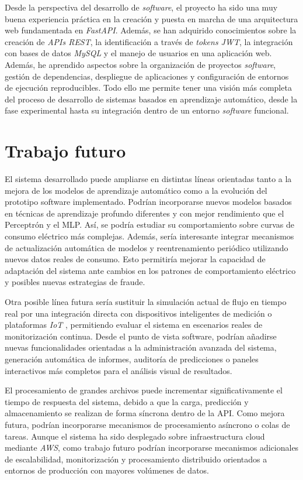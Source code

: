 \documentclass[12pt,a4paper]{report}
\begin{document}
Desde la perspectiva del desarrollo de \emph{software}, el proyecto ha sido una muy buena experiencia práctica en la creación y puesta en marcha de una arquitectura web fundamentada en \emph{FastAPI}. Además, se han adquirido conocimientos sobre la creación de \emph{APIs REST}, la identificación a través de \emph{tokens JWT}, la integración con bases de datos \emph{MySQL} y el manejo de usuarios en una aplicación web. Además, he aprendido aspectos sobre la organización de proyectos \emph{software}, gestión de dependencias, despliegue de aplicaciones y configuración de entornos de ejecución reproducibles. Todo ello me permite tener una visión más completa del proceso de desarrollo de sistemas basados en aprendizaje automático, desde la fase experimental hasta su integración dentro de un entorno \emph{software} funcional.


\section{Trabajo futuro}

El sistema desarrollado puede ampliarse en distintas líneas orientadas tanto a la mejora de los modelos de aprendizaje automático como a la evolución del prototipo software implementado. Podrían incorporarse nuevos modelos basados en técnicas de aprendizaje profundo diferentes y con mejor rendimiento que el Perceptrón y el MLP. Así, se podría estudiar su comportamiento sobre curvas de consumo eléctrico más complejas. Además, sería interesante integrar mecanismos de actualización automática de modelos y reentrenamiento periódico utilizando nuevos datos reales de consumo. Esto permitiría mejorar la capacidad de adaptación del sistema ante cambios en los patrones de comportamiento eléctrico y posibles nuevas estrategias de fraude.

Otra posible línea futura sería  sustituir la simulación actual de flujo en tiempo real por una integración directa con dispositivos inteligentes de medición o plataformas \emph{IoT} \cite{IoT}, permitiendo evaluar el sistema en escenarios reales de monitorización continua. Desde el punto de vista software, podrían añadirse nuevas funcionalidades orientadas a la administración avanzada del sistema, generación automática de informes, auditoría de predicciones o paneles interactivos más completos para el análisis visual de resultados.

El procesamiento de grandes archivos puede incrementar significativamente el tiempo de respuesta del sistema, debido a que la carga, predicción y almacenamiento se realizan de forma síncrona dentro de la API. Como mejora futura, podrían incorporarse mecanismos de procesamiento asíncrono o colas de tareas. Aunque el sistema ha sido desplegado sobre infraestructura cloud mediante \emph{AWS}, como trabajo futuro podrían incorporarse mecanismos adicionales de escalabilidad, monitorización y procesamiento distribuido orientados a entornos de producción con mayores volúmenes de datos.
\end{document}

